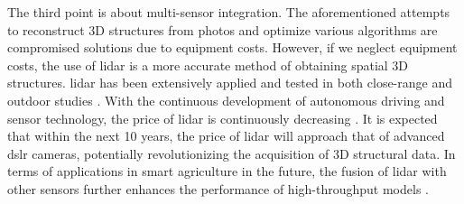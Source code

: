   The third point is about multi-sensor integration. 
  The aforementioned attempts to reconstruct 3D structures from photos and optimize various algorithms are compromised solutions due to equipment costs. 
  However, if we neglect equipment costs, the use of \gls{lidar} is a more accurate method of obtaining spatial 3D structures. 
  \gls{lidar} has been extensively applied and tested in both close-range and outdoor studies \mbox{\citep{thapa_novel_2018,lin_segmentation_2022,jin_lidar_2021}}. 
  With the continuous development of autonomous driving and sensor technology, 
  the price of \gls{lidar} is continuously decreasing \mbox{\citep{ackerman_lidar_2016}}. 
  It is expected that within the next 10 years, 
  the price of \gls{lidar} will approach that of advanced \gls{dslr} cameras, 
  potentially revolutionizing the acquisition of 3D structural data. 
  In terms of applications in smart agriculture in the future, 
  the fusion of \gls{lidar} with other sensors further enhances the performance of high-throughput models \mbox{\citep{li_multi-source_2023,nguyen_uav_2023}}.



